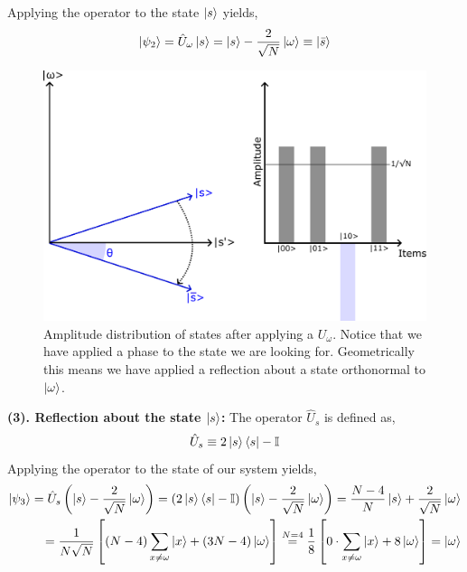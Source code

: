 Applying the operator to the state $\ket{s}$ yields,
\begin{equation}
    \ket{\psi_{2}} = \hat{U}_{\omega}\ket{s} = \ket{s} -\frac{2}{\sqrt{N}}\ket{\omega} \equiv \ket{\bar{s}}
\end{equation}
\begin{figure}[H]
    \centering
    \includegraphics[scale=0.55]{Figures/Grover_Step2.pdf}
    \caption{Amplitude distribution of states after applying a $U_{\omega}$. Notice that we have applied a phase to the state we are looking for. Geometrically this means we have applied a reflection about a state orthonormal to $\ket\omega$.}
    \label{fig:Grover_step2}
\end{figure}
\textbf{(3). Reflection about the state $\ket{s}$:} The operator $\hat{U}_{s}$ is defined as,
\begin{equation}
    \hat{U}_{s} \equiv 2\ket{s}\bra{s} - \mathbb{I}
\end{equation}
Applying the operator to the state of our system yields,
\begin{align*}
    \ket{\psi_{3}} = \hat{U}_{s}\left(\ket{s} -\frac{2}{\sqrt{N}}\ket{\omega}\right) = \left(2\ket{s}\bra{s} - \mathbb{I}\right)\left(\ket{s} - \frac{2}{\sqrt{N}}\ket{\omega}\right) = \frac{N - 4}{N}\ket{s} + \frac{2}{\sqrt{N}}\ket{\omega} \\
    = \frac{1}{N\sqrt{N}} \left[\left(N - 4\right)\sum_{x\neq \omega}\ket{x} + \left(3N-4\right)\ket{\omega}\right] \overset{N=4}{=} \frac{1}{8} \left[0 \cdot \sum_{x\neq \omega}\ket{x} + 8\ket{\omega}\right] = \ket{\omega}
\end{align*}
